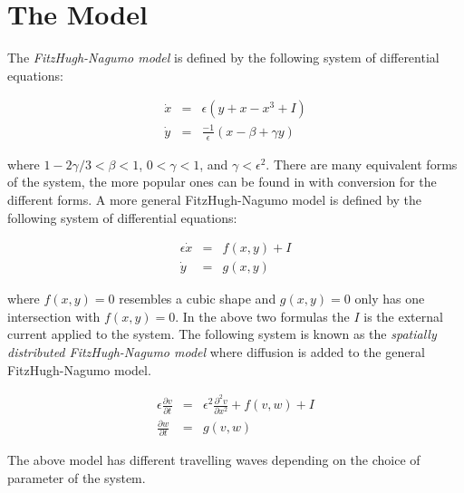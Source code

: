 \documentclass[12pt]{article}
\begin{document}
\section{The Model}

The \emph{FitzHugh-Nagumo model} is defined by the following system of differential equations:

\begin{eqnarray*}
\dot{x} & = & \epsilon(y+x-x^3+I)\\
\dot{y} & = & \frac{-1}{\epsilon}(x-\beta+\gamma y)
\end{eqnarray*}

where $1-2\gamma/3<\beta<1$, $0<\gamma<1$, and $\gamma<\epsilon^2$.\cite{FR} There are many equivalent forms of the system, the more popular ones can be found in \cite{RGG} with conversion for the different forms.  A more general FitzHugh-Nagumo model is defined by the following system of differential equations:

\begin{eqnarray*}
\epsilon\dot{x} & = & f(x,y) + I\\
\dot{y} & = & g(x,y)
\end{eqnarray*}

where $f(x,y)=0$ resembles a cubic shape and $g(x,y)=0$ only has one intersection with $f(x,y)=0$.\cite{KS}  In the above two formulas the $I$ is the external current applied to the system. The following system is known as the \emph{spatially distributed FitzHugh-Nagumo model} where diffusion is added to the general FitzHugh-Nagumo model.

\begin{eqnarray*}
\epsilon\frac{\partial v}{\partial t} & = & \epsilon^2\frac{\partial^2 v}{\partial x^2}+f(v,w)+I\\
\frac{\partial w}{\partial t} & = & g(v,w)
\end{eqnarray*}

The above model has different travelling waves depending on the choice of parameter of the system.
\end{document}
